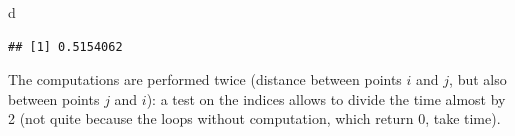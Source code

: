 \documentclass[
  12pt,
  american,
  a4paper,
  extrafontsizes,onecolumn,openright
  ]{memoir}
\newenvironment{Shaded}{\begin{snugshade}}{\end{snugshade}}
\newcommand{\ControlFlowTok}[1]{\textcolor[rgb]{0.13,0.29,0.53}{\textbf{#1}}}
\newcommand{\DecValTok}[1]{\textcolor[rgb]{0.00,0.00,0.81}{#1}}
\newcommand{\FunctionTok}[1]{\textcolor[rgb]{0.00,0.00,0.00}{#1}}
\newcommand{\NormalTok}[1]{#1}
\newcommand{\OtherTok}[1]{\textcolor[rgb]{0.56,0.35,0.01}{#1}}
\newcommand{\SpecialCharTok}[1]{\textcolor[rgb]{0.00,0.00,0.00}{#1}}
\newlength{\rf}
\begin{document}
\begin{Shaded}
\begin{Highlighting}[]
\NormalTok{d}
\end{Highlighting}
\end{Shaded}

\begin{verbatim}
## [1] 0.5154062
\end{verbatim}

\normalsize

The computations are performed twice (distance between points \(i\) and \(j\), but also between points \(j\) and \(i\)): a test on the indices allows to divide the time almost by 2 (not quite because the loops without computation, which return \(0\), take time).

\scriptsize

\begin{Shaded}
\end{Shaded}
\end{document}
